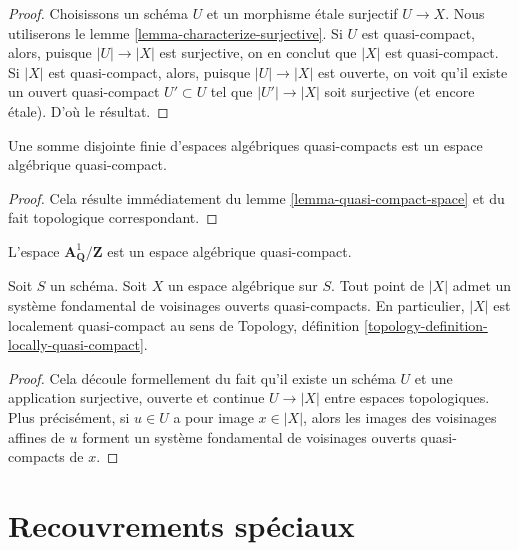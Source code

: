 \begin{proof}
Choisissons un schéma $U$ et un morphisme étale surjectif $U \to X$.
Nous utiliserons le lemme \ref{lemma-characterize-surjective}.
Si $U$ est quasi-compact, alors, puisque $|U| \to |X|$ est surjective,
on en conclut que $|X|$ est quasi-compact.
Si $|X|$ est quasi-compact, alors, puisque $|U| \to |X|$ est ouverte,
on voit qu'il existe un ouvert quasi-compact $U' \subset U$
tel que $|U'| \to |X|$ soit surjective (et encore étale).
D'où le résultat.
\end{proof}

\begin{lemma}
\label{lemma-finite-disjoint-quasi-compact}
Une somme disjointe finie d'espaces algébriques quasi-compacts est
un espace algébrique quasi-compact.
\end{lemma}

\begin{proof}
Cela résulte immédiatement du
lemme \ref{lemma-quasi-compact-space}
et du fait topologique correspondant.
\end{proof}

\begin{example}
\label{example-quasi-compact-not-very-reasonable}
L'espace $\mathbf{A}^1_{\mathbf{Q}}/\mathbf{Z}$ est un espace algébrique
quasi-compact.
\end{example}

\begin{lemma}
\label{lemma-space-locally-quasi-compact}
Soit $S$ un schéma.
Soit $X$ un espace algébrique sur $S$.
Tout point de $|X|$ admet un système fondamental de voisinages
ouverts quasi-compacts.
En particulier, $|X|$ est localement quasi-compact au sens de
Topology, définition \ref{topology-definition-locally-quasi-compact}.
\end{lemma}

\begin{proof}
Cela découle formellement du fait qu'il existe un schéma
$U$ et une application surjective, ouverte et continue
$U \to |X|$ entre espaces topologiques. Plus précisément, si
$u \in U$ a pour image $x \in |X|$, alors les images des voisinages
affines de $u$ forment un système fondamental de voisinages ouverts
quasi-compacts de $x$.
\end{proof}







\section{Recouvrements spéciaux}
\label{section-special-coverings}

